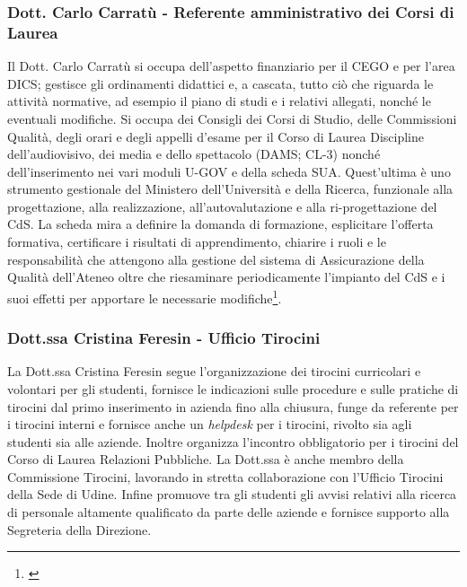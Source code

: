         \subsubsection{Dott. Carlo Carratù - Referente amministrativo dei Corsi di Laurea}
            Il Dott. Carlo Carratù si occupa dell'aspetto finanziario per il CEGO e per l'area DICS; gestisce gli ordinamenti didattici e, a cascata, tutto ciò che riguarda le attività normative, ad esempio il piano di studi e i relativi allegati, nonché le eventuali modifiche. Si occupa dei Consigli dei Corsi di Studio, delle Commissioni Qualità, degli orari e degli appelli d'esame per il Corso di Laurea Discipline dell'audiovisivo, dei media e dello spettacolo (DAMS; CL-3) nonché dell'inserimento nei vari moduli U-GOV e della scheda SUA. Quest'ultima è uno strumento gestionale del Ministero dell'Università e della Ricerca, funzionale alla progettazione, alla realizzazione, all'autovalutazione e alla ri-progettazione del CdS. La scheda mira a definire la domanda di formazione, esplicitare l'offerta formativa, certificare i risultati di apprendimento, chiarire i ruoli e le responsabilità che attengono alla gestione del sistema di Assicurazione della Qualità dell'Ateneo oltre che riesaminare periodicamente l'impianto del CdS e i suoi effetti per apportare le necessarie modifiche\footnote{\cite{schedaSua}}. 
        \subsubsection{Dott.ssa Cristina Feresin - Ufficio Tirocini}
            La Dott.ssa Cristina Feresin segue l'organizzazione dei tirocini curricolari e volontari per gli studenti, fornisce le indicazioni sulle procedure e sulle pratiche di tirocini dal primo inserimento in azienda fino alla chiusura, funge da referente per i tirocini interni e fornisce anche un \textsl{helpdesk} per i tirocini, rivolto sia agli studenti sia alle aziende. Inoltre organizza l'incontro obbligatorio per i tirocini del Corso di Laurea Relazioni Pubbliche. La Dott.ssa è anche membro della Commissione Tirocini, lavorando in stretta collaborazione con l'Ufficio Tirocini della Sede di Udine.\newline
            Infine promuove tra gli studenti gli avvisi relativi alla ricerca di personale altamente qualificato da parte delle aziende e fornisce supporto alla Segreteria della Direzione. 
